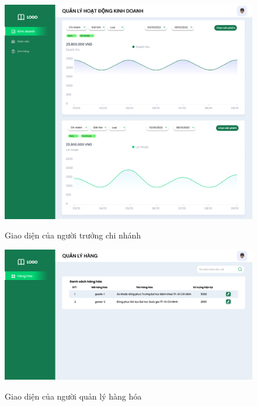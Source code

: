             \begin{figure}[!htp]
                \centering
                \includegraphics[width=12cm]{img/UI/admin/branch-leader.png}
                \label{45}
                \newline
                \caption{Giao diện của người trưởng chi nhánh}
            \end{figure}
        \newpage


            \begin{figure}[!htp]
                \centering
                \includegraphics[width=12cm]{img/UI/admin/sub ADmin -Quản lý hàng.png}
                \label{46}
                \newline
                \caption{Giao diện của người quản lý hàng hóa}
            \end{figure}
        
